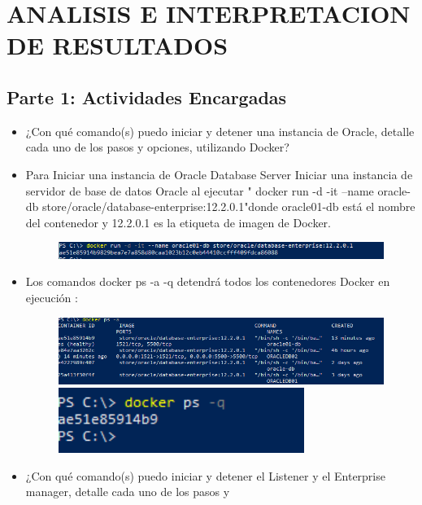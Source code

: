 \section{ANALISIS E INTERPRETACION DE RESULTADOS} 


\subsection{Parte 1: Actividades Encargadas}
	\begin{itemize}
		\item ¿Con qué comando(s) puedo iniciar y detener una instancia de Oracle, detalle cada uno de los pasos y opciones,
utilizando Docker?
                     \item Para  Iniciar una instancia de Oracle Database Server
Iniciar una instancia de servidor de base de datos Oracle al ejecutar
" docker run -d -it --name oracle-db store/oracle/database-enterprise:12.2.0.1"donde oracle01-db está el nombre del contenedor y 12.2.0.1 es la etiqueta de imagen de Docker.
                      \begin{figure}[H]
		\begin{center}
		\includegraphics[width=15cm]{./Imagenes/200}
		\end{center}
		\end{figure}
                      \item Los comandos docker ps -a -q detendrá todos los contenedores Docker en ejecución :
                      \begin{figure}[H]
		\begin{center}
		\includegraphics[width=15cm]{./Imagenes/201}
                      \includegraphics[width=8cm]{./Imagenes/202}
		\end{center}
		\end{figure}
		\item ¿Con qué comando(s) puedo iniciar y detener el Listener y el Enterprise manager, detalle cada uno de los pasos y

\end{itemize}
